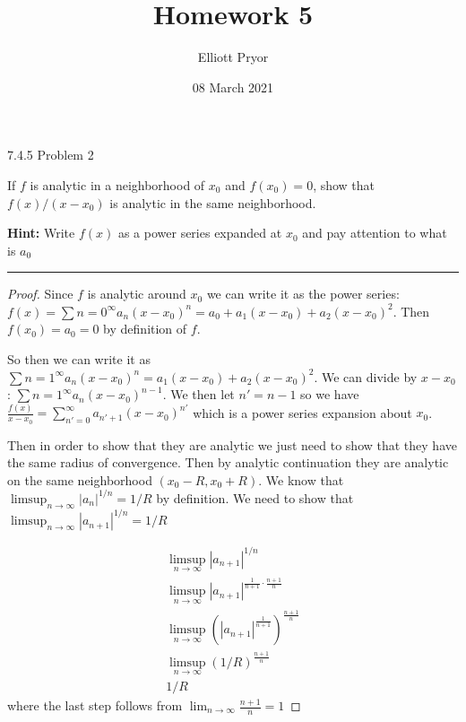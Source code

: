 \documentclass[11pt]{article}
\title{Homework 5}
\author{Elliott Pryor}
\date{08 March 2021}
\begin{document}
\maketitle

 7.4.5 Problem 2

If $f$ is analytic in a neighborhood of $x_0$ and $f(x_0) = 0$, 
show that $f(x)/(x - x_0)$ is analytic in the same neighborhood.

\textbf{Hint:} Write $f(x)$ as a power series expanded at $x_0$ and pay attention to what is $a_0$

\hrule

\begin{proof}
    
    Since $f$ is analytic around $x_0$ we can write it as the power series: 
    $f(x) = \sum{n=0} ^\infty a_n (x - x_0)^n = a_0 + a_1 (x - x_0) + a_2 (x - x_0)^2$.
    Then $f(x_0) = a_0 = 0$ by definition of $f$.  

    So then we can write it as $\sum{n=1} ^\infty a_n (x - x_0)^n = a_1 (x - x_0) + a_2 (x - x_0)^2$.
    We can divide by $x - x_0$: $\sum{n=1} ^\infty a_n (x - x_0)^{n-1}$.
    We then let $n' = n-1$ so we have\\
    $\frac{f(x)}{x-x_0} = \sum_{n'=0} ^\infty a_{n'+1} (x - x_0)^{n'}$
    which is a power series expansion about $x_0$.

    Then in order to show that they are analytic we just need to show that they have the same radius of convergence.
    Then by analytic continuation they are analytic on the same neighborhood $(x_0 - R, x_0 + R)$.
    We know that $\limsup_{n \to \infty} |a_n|^{1/n} = 1/R$ by definition.
    We need to show that $\limsup_{n \to \infty} |a_{n+1}|^{1/n} = 1/R$

    \begin{align*}
        \limsup_{n \to \infty} |a_{n+1}|^{1/n} \\
        \limsup_{n \to \infty} |a_{n+1}|^{\frac{1}{n+1} \cdot \frac{n+1}{n}}\\
        \limsup_{n \to \infty} \left(|a_{n+1}|^{\frac{1}{n+1}}\right)^{\frac{n+1}{n}}\\
        \limsup_{n \to \infty} (1/R)^{\frac{n+1}{n}}\\
        1/R
    \end{align*}
    where the last step follows from $\lim_{n \to \infty} \frac{n+1}{n} = 1$
\end{proof}
\end{document}
